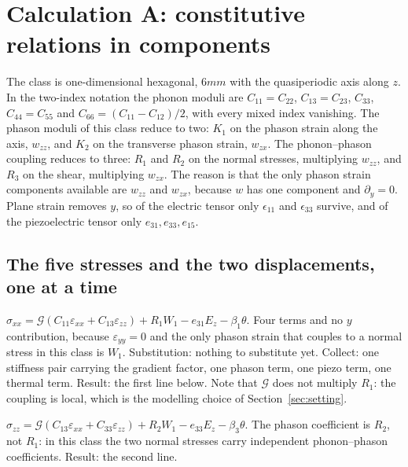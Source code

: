 \documentclass[11pt]{article}
\makeatletter
\newif\ifshowworked
\newenvironment{worked}{%
  \ifshowworked\par\smallskip\noindent\textit{Working.}\par\smallskip\else
  \setbox\z@\vbox\bgroup\fi}{\ifshowworked\par\smallskip\else\egroup\fi}
\newcommand{\Gcal}{\mathcal{G}}
\makeatother
\begin{document}
\section{Calculation A: constitutive relations in components}\label{sec:calcA}

\begin{worked}
The class is one-dimensional hexagonal, $6mm$ with the quasiperiodic axis along $z$. In the two-index
notation the phonon moduli are $C_{11}=C_{22}$, $C_{13}=C_{23}$, $C_{33}$, $C_{44}=C_{55}$ and
$C_{66}=(C_{11}-C_{12})/2$, with every mixed index vanishing.
The phason moduli of this class reduce to two: $K_1$ on the phason strain along the axis, $w_{zz}$, and
$K_2$ on the transverse phason strain, $w_{zx}$.
The phonon--phason coupling reduces to three: $R_1$ and $R_2$ on the normal stresses, multiplying
$w_{zz}$, and $R_3$ on the shear, multiplying $w_{zx}$. The reason is that the only phason strain
components available are $w_{zz}$ and $w_{zx}$, because $w$ has one component and $\partial_y=0$.
Plane strain removes $y$, so of the electric tensor only $\epsilon_{11}$ and $\epsilon_{33}$ survive, and of
the piezoelectric tensor only $e_{31},e_{33},e_{15}$.
\end{worked}

\subsection*{The five stresses and the two displacements, one at a time}

\begin{worked}
$\sigma_{xx}=\Gcal(C_{11}\varepsilon_{xx}+C_{13}\varepsilon_{zz})+R_1W_1-e_{31}E_z-\beta_1\theta$. Four
terms and no $y$ contribution, because $\varepsilon_{yy}=0$ and the only phason strain that couples to a
normal stress in this class is $W_1$. Substitution: nothing to substitute yet. Collect: one stiffness
pair carrying the gradient factor, one phason term, one piezo term, one thermal term. Result: the first
line below. Note that $\Gcal$ does not multiply $R_1$: the coupling is local, which is the modelling
choice of Section~\ref{sec:setting}.
\end{worked}

\begin{worked}
$\sigma_{zz}=\Gcal(C_{13}\varepsilon_{xx}+C_{33}\varepsilon_{zz})+R_2W_1-e_{33}E_z-\beta_3\theta$. The
phason coefficient is $R_2$, not $R_1$: in this class the two normal stresses carry independent
phonon--phason coefficients. Result: the second line.
\end{worked}
\end{document}

